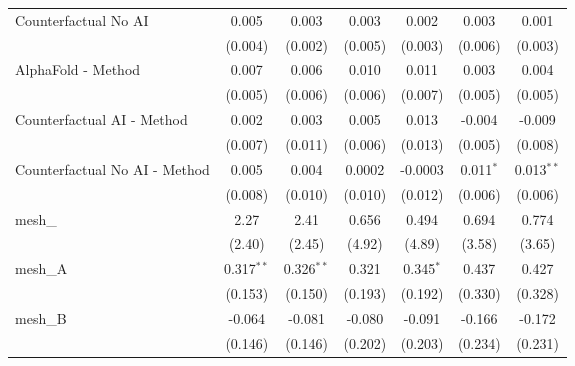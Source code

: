 \begin{tabular}{lcccccc}
   Counterfactual No AI                                        & 0.005         & 0.003        & 0.003        & 0.002        & 0.003          & 0.001\\   
                                                               & (0.004)       & (0.002)      & (0.005)      & (0.003)      & (0.006)        & (0.003)\\   
   AlphaFold - Method                                          & 0.007         & 0.006        & 0.010        & 0.011        & 0.003          & 0.004\\   
                                                               & (0.005)       & (0.006)      & (0.006)      & (0.007)      & (0.005)        & (0.005)\\   
   Counterfactual AI - Method                                  & 0.002         & 0.003        & 0.005        & 0.013        & -0.004         & -0.009\\   
                                                               & (0.007)       & (0.011)      & (0.006)      & (0.013)      & (0.005)        & (0.008)\\   
   Counterfactual No AI - Method                               & 0.005         & 0.004        & 0.0002       & -0.0003      & 0.011$^{*}$    & 0.013$^{**}$\\   
                                                               & (0.008)       & (0.010)      & (0.010)      & (0.012)      & (0.006)        & (0.006)\\   
   mesh\_                                                      & 2.27          & 2.41         & 0.656        & 0.494        & 0.694          & 0.774\\   
                                                               & (2.40)        & (2.45)       & (4.92)       & (4.89)       & (3.58)         & (3.65)\\   
   mesh\_A                                                     & 0.317$^{**}$  & 0.326$^{**}$ & 0.321        & 0.345$^{*}$  & 0.437          & 0.427\\   
                                                               & (0.153)       & (0.150)      & (0.193)      & (0.192)      & (0.330)        & (0.328)\\   
   mesh\_B                                                     & -0.064        & -0.081       & -0.080       & -0.091       & -0.166         & -0.172\\   
                                                               & (0.146)       & (0.146)      & (0.202)      & (0.203)      & (0.234)        & (0.231)\\   

\end{tabular}
